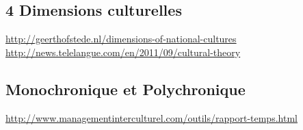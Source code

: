 \subsection{4 Dimensions culturelles}

\noindent
\url{http://geerthofstede.nl/dimensions-of-national-cultures}\\
\url{http://news.telelangue.com/en/2011/09/cultural-theory}

\subsection{Monochronique et Polychronique}

\noindent
\url{http://www.managementinterculturel.com/outils/rapport-temps.html}\\

